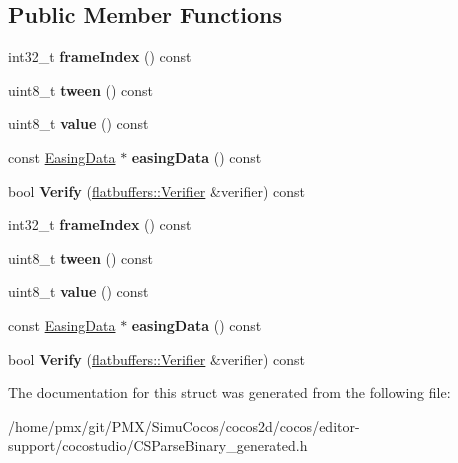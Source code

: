 \subsection*{Public Member Functions}
\begin{DoxyCompactItemize}
\item 
\mbox{\label{structflatbuffers_1_1BoolFrame_ab731d56b1afe153f45b084c39fbcfdb4}} 
int32\+\_\+t {\bfseries frame\+Index} () const
\item 
\mbox{\label{structflatbuffers_1_1BoolFrame_ac31968db2a6e17c931e6ebc6b907a52a}} 
uint8\+\_\+t {\bfseries tween} () const
\item 
\mbox{\label{structflatbuffers_1_1BoolFrame_af49b0749453ffbe2b18dc9e35d7e1ce3}} 
uint8\+\_\+t {\bfseries value} () const
\item 
\mbox{\label{structflatbuffers_1_1BoolFrame_a5debd92357aaca9449f644d50a67afe8}} 
const \hyperlink{structflatbuffers_1_1EasingData}{Easing\+Data} $\ast$ {\bfseries easing\+Data} () const
\item 
\mbox{\label{structflatbuffers_1_1BoolFrame_aa27fcee8f197feecb45d54c5a6ac1c38}} 
bool {\bfseries Verify} (\hyperlink{classflatbuffers_1_1Verifier}{flatbuffers\+::\+Verifier} \&verifier) const
\item 
\mbox{\label{structflatbuffers_1_1BoolFrame_ab731d56b1afe153f45b084c39fbcfdb4}} 
int32\+\_\+t {\bfseries frame\+Index} () const
\item 
\mbox{\label{structflatbuffers_1_1BoolFrame_ac31968db2a6e17c931e6ebc6b907a52a}} 
uint8\+\_\+t {\bfseries tween} () const
\item 
\mbox{\label{structflatbuffers_1_1BoolFrame_af49b0749453ffbe2b18dc9e35d7e1ce3}} 
uint8\+\_\+t {\bfseries value} () const
\item 
\mbox{\label{structflatbuffers_1_1BoolFrame_a5debd92357aaca9449f644d50a67afe8}} 
const \hyperlink{structflatbuffers_1_1EasingData}{Easing\+Data} $\ast$ {\bfseries easing\+Data} () const
\item 
\mbox{\label{structflatbuffers_1_1BoolFrame_aa27fcee8f197feecb45d54c5a6ac1c38}} 
bool {\bfseries Verify} (\hyperlink{classflatbuffers_1_1Verifier}{flatbuffers\+::\+Verifier} \&verifier) const
\end{DoxyCompactItemize}


The documentation for this struct was generated from the following file\+:\begin{DoxyCompactItemize}
\item 
/home/pmx/git/\+P\+M\+X/\+Simu\+Cocos/cocos2d/cocos/editor-\/support/cocostudio/C\+S\+Parse\+Binary\+\_\+generated.\+h\end{DoxyCompactItemize}
